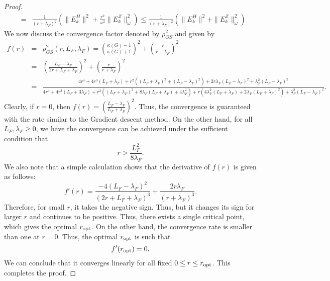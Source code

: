 \begin{proof}
\begin{eqnarray*}
&=& \frac{1}{(r + \lambda_F)^2} \left ( \|E_k^H\|^2 + \frac{r^2}{\omega^2} \|E_k^Z\|_\omega ^2 \right ) \leq \frac{1}{(r + \lambda_F)^2} \left ( \|E_k^H\|^2 + \|E_k^Z\|_\omega ^2 \right ) 
\end{eqnarray*}
We now discuss the convergence factor denoted by $\rho_{GS}^2$ and given by 
{\small{\begin{eqnarray*}
f(r) &=& \rho^2_{GS}(r, L_F, \lambda_F) = \left ( \frac{\kappa(G) - 1}{\kappa(G) + 1} \right )^2 + \left ( \frac{r}{r+\lambda_F} \right )^2 \\
&=& \left ( \frac{L_F - \lambda_F}{2r + L_F + \lambda_F} \right )^2 + \left ( \frac{r}{r+\lambda_F} \right )^2 \\
&=& \frac{4r^4 + 4r^3 ( L_F + \lambda_F) + r^2 ((L_F + \lambda_F)^2 + (L_F-\lambda_F)^2) + 2r \lambda_F(L_F - \lambda_F)^2 + \lambda_F^2(L_F - \lambda_F)^2}{4r^4 + 4r^3 ( L_F + 3\lambda_F) + r^2 ((L_F + \lambda_F)^2 + 8\lambda_F (L_F+\lambda_F) + 4\lambda_F^2) + r (4\lambda_F^2(L_F + \lambda_F) + 2\lambda_F(L_F + \lambda_F)^2) + \lambda_F^2(L_F - \lambda_F)^2}. 
\end{eqnarray*}}}
Clearly, if $r = 0$, then $f(r) = \left ( \frac{L_F - \lambda_F}{L_F + \lambda_F} \right )^2.$ Thus, the convergence is guaranteed with the rate similar to the Gradient descent method. On the other hand, for all $L_F, \lambda_F \geq 0$, we have the convergence can be achieved under the sufficient condition that
\begin{equation}
r > \frac{L_F^2}{8 \lambda_F}.
\end{equation}
We also note that a simple calculation shows that the derivative of $f(r)$ is given as follows: 
\begin{equation}
f'(r) = \frac{-4(L_F - \lambda_F)^2}{(2r + L_F + \lambda_F)^3} + \frac{2r \lambda_F}{(r + \lambda_F)^3}. 
\end{equation}
Therefore, for small $r$, it takes the negative sign. Thus, but it changes its sign for larger $r$ and continues to be positive. Thus, there exists a single critical point, which gives the optimal $r_{\rm opt}$. On the other hand, the convergence rate is smaller than one at $r = 0$. Thus, the optimal $r_{\rm opt}$ is such that 
\begin{equation}
f'(r_{\rm opt}) = 0. 
\end{equation} 
We can conclude that it converges linearly for all fixed $0 \leq r \leq r_{\rm opt}$. This completes the proof.
\end{proof} 
